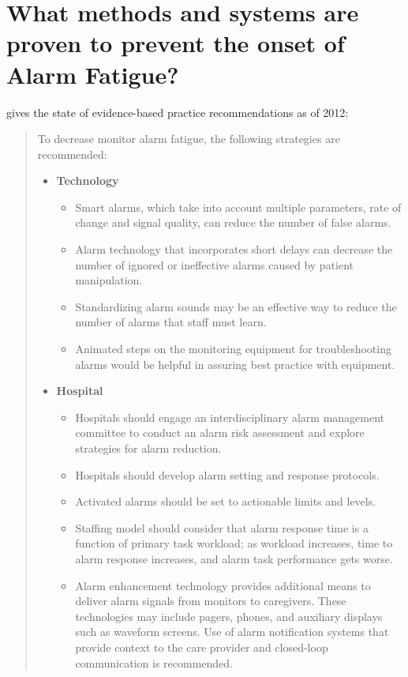 \section{What methods and systems are proven to prevent the onset of Alarm Fatigue?}

\citet[p.277]{cvach2012monitor} gives the state of evidence-based practice recommendations as of 2012:\\

\begin{quotation}
	To decrease monitor alarm fatigue, the following strategies are recommended:
	\begin{itemize}
		\item \textbf{Technology}
		\begin{itemize}
			\item Smart alarms, which take into account multiple parameters, rate of change and signal quality, can reduce the number of false alarms.
			\item Alarm technology that incorporates short delays can decrease the number of ignored or ineffective alarms caused by patient manipulation.
			\item Standardizing alarm sounds may be an effective way to reduce the number of alarms that staff must learn.
			\item Animated steps on the monitoring equipment for troubleshooting alarms would be helpful in assuring best practice with equipment.
		\end{itemize}
		\item \textbf{Hospital}
		\begin{itemize}
			\item Hospitals should engage an interdisciplinary alarm management committee to conduct an alarm risk assessment and explore strategies for alarm reduction.
			\item Hospitals should develop alarm setting and response protocols.
			\item Activated alarms should be set to actionable limits and levels.
			\item Staffing model should consider that alarm response time is a function of primary task workload; as workload increases, time to alarm response increases, and alarm task performance gets worse.
			\item Alarm enhancement technology provides additional means to deliver alarm signals from monitors to caregivers. These technologies may include pagers, phones, and auxiliary displays such as waveform screens. Use of alarm notification systems that provide context to the care provider and closed-loop communication is recommended.

\end{itemize}
\end{itemize}
\end{quotation}
